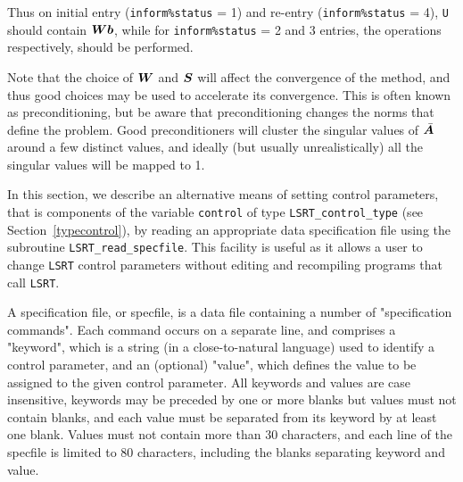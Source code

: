 \documentclass{galahad}
\newcommand{\packagename}{LS\-RT}
\begin{document}
Thus on initial entry ({\tt inform\%status} = 1) and re-entry
({\tt inform\%status} = 4), {\tt U} should contain ${\bm{W}} {\bm{b}}$,
while for {\tt inform\%status} = 2 and 3 entries, the operations
respectively, should be performed.

Note that the choice of ${\bm{W}}$ and ${\bm{S}}$ will affect the convergence of the
method, and thus good choices may be used to accelerate its convergence. This
is often known as preconditioning, but be aware that preconditioning changes
the norms that define the problem. Good preconditioners will cluster
the singular values of $\bar{{\bm{A}}}$ around a few distinct values, and ideally
(but usually unrealistically) all the singular values will be mapped to 1.




\galfeatures
\noindent In this section, we describe an alternative means of setting
control parameters, that is components of the variable {\tt control} of type
{\tt \packagename\_control\_type}
(see Section~\ref{typecontrol}),
by reading an appropriate data specification file using the
subroutine {\tt \packagename\_read\_specfile}. This facility
is useful as it allows a user to change  {\tt \packagename} control parameters
without editing and recompiling programs that call {\tt \packagename}.

A specification file, or specfile, is a data file containing a number of
"specification commands". Each command occurs on a separate line,
and comprises a "keyword",
which is a string (in a close-to-natural language) used to identify a
control parameter, and
an (optional) "value", which defines the value to be assigned to the given
control parameter. All keywords and values are case insensitive,
keywords may be preceded by one or more blanks but
values must not contain blanks, and
each value must be separated from its keyword by at least one blank.
Values must not contain more than 30 characters, and
each line of the specfile is limited to 80 characters,
including the blanks separating keyword and value.
\end{document}
